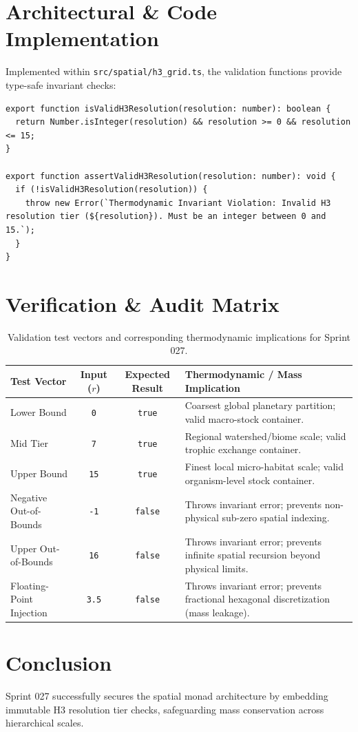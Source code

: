 \documentclass[11pt, a4paper]{article}
\begin{document}
\section{Architectural \& Code Implementation}
Implemented within \texttt{src/spatial/h3\_grid.ts}, the validation functions provide type-safe invariant checks:

\begin{verbatim}
export function isValidH3Resolution(resolution: number): boolean {
  return Number.isInteger(resolution) && resolution >= 0 && resolution <= 15;
}

export function assertValidH3Resolution(resolution: number): void {
  if (!isValidH3Resolution(resolution)) {
    throw new Error(`Thermodynamic Invariant Violation: Invalid H3 resolution tier (${resolution}). Must be an integer between 0 and 15.`);
  }
}
\end{verbatim}

\section{Verification \& Audit Matrix}
\begin{table}[h!]
\centering
\begin{tabular}{lccl}
\toprule
\textbf{Test Vector} & \textbf{Input ($r$)} & \textbf{Expected Result} & \textbf{Thermodynamic / Mass Implication} \\
\midrule
Lower Bound & \texttt{0} & \texttt{true} & Coarsest global planetary partition; valid macro-stock container. \\
Mid Tier & \texttt{7} & \texttt{true} & Regional watershed/biome scale; valid trophic exchange container. \\
Upper Bound & \texttt{15} & \texttt{true} & Finest local micro-habitat scale; valid organism-level stock container. \\
Negative Out-of-Bounds & \texttt{-1} & \texttt{false} & Throws invariant error; prevents non-physical sub-zero spatial indexing. \\
Upper Out-of-Bounds & \texttt{16} & \texttt{false} & Throws invariant error; prevents infinite spatial recursion beyond physical limits. \\
Floating-Point Injection & \texttt{3.5} & \texttt{false} & Throws invariant error; prevents fractional hexagonal discretization (mass leakage). \\
\bottomrule
\end{tabular}
\caption{Validation test vectors and corresponding thermodynamic implications for Sprint 027.}
\label{tab:sprint027_audit}
\end{table}

\section{Conclusion}
Sprint 027 successfully secures the spatial monad architecture by embedding immutable H3 resolution tier checks, safeguarding mass conservation across hierarchical scales.
\end{document}
